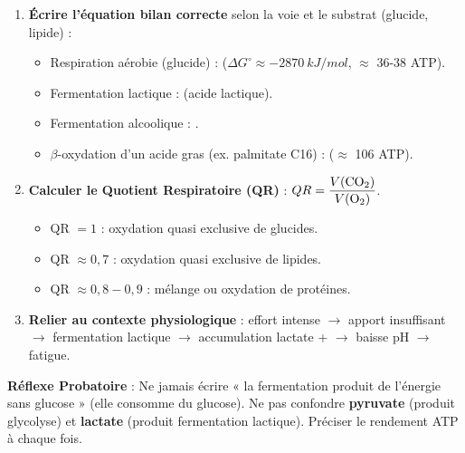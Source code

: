 \documentclass[11pt]{article}
\begin{document}
\begin{methode}
\begin{enumerate}
\item \textbf{Écrire l'équation bilan correcte} selon la voie et le substrat (glucide, lipide) :
\begin{itemize}
\item Respiration aérobie (glucide) :  \quad ($\Delta G^\circ \approx \SI{-2870}{kJ/mol}$, $\approx$ 36-38 ATP).
\item Fermentation lactique :  (acide lactique).
\item Fermentation alcoolique : .
\item $\beta$-oxydation d'un acide gras (ex. palmitate C16) :  ($\approx$ 106 ATP).
\end{itemize}
\item \textbf{Calculer le Quotient Respiratoire (QR)} : $QR = \dfrac{V(\ce{CO2})}{V(\ce{O2})}$.
\begin{itemize}
\item QR $= 1$ : oxydation quasi exclusive de glucides.
\item QR $\approx 0,7$ : oxydation quasi exclusive de lipides.
\item QR $\approx 0,8-0,9$ : mélange ou oxydation de protéines.
\end{itemize}
\item \textbf{Relier au contexte physiologique} : effort intense $\rightarrow$ apport  insuffisant $\rightarrow$ fermentation lactique $\rightarrow$ accumulation lactate +  $\rightarrow$ baisse pH $\rightarrow$ fatigue.
\end{enumerate}
\textbf{Réflexe Probatoire} : Ne jamais écrire « la fermentation produit de l'énergie sans glucose » (elle consomme du glucose). Ne pas confondre \textbf{pyruvate} (produit glycolyse) et \textbf{lactate} (produit fermentation lactique). Préciser le rendement ATP à chaque fois.
\end{methode}
\end{document}
